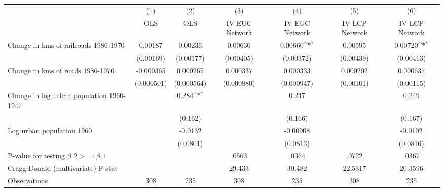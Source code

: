 {
\def\sym#1{\ifmmode^{#1}\else\(^{#1}\)\fi}
\begin{tabular}{l*{6}{c}}
\hline\hline
                &\multicolumn{1}{c}{(1)}&\multicolumn{1}{c}{(2)}&\multicolumn{1}{c}{(3)}&\multicolumn{1}{c}{(4)}&\multicolumn{1}{c}{(5)}&\multicolumn{1}{c}{(6)}\\
                &\multicolumn{1}{c}{OLS}&\multicolumn{1}{c}{OLS}&\multicolumn{1}{c}{IV EUC Network}&\multicolumn{1}{c}{IV EUC Network}&\multicolumn{1}{c}{IV LCP Network}&\multicolumn{1}{c}{IV LCP Network}\\
\hline
Change in kms of railroads 1986-1970&  0.00187         &  0.00236         &  0.00630         &  0.00660\sym{*}  &  0.00595         &  0.00720\sym{*}  \\
                &(0.00169)         &(0.00177)         &(0.00405)         &(0.00372)         &(0.00439)         &(0.00413)         \\
[1em]
Change in kms of roads 1986-1970&-0.000365         & 0.000265         & 0.000337         & 0.000333         & 0.000202         & 0.000637         \\
                &(0.000501)         &(0.000564)         &(0.000880)         &(0.000947)         &(0.00101)         &(0.00115)         \\
[1em]
Change in log urban population 1960-1947&                  &    0.284\sym{*}  &                  &    0.247         &                  &    0.249         \\
                &                  &  (0.162)         &                  &  (0.166)         &                  &  (0.167)         \\
[1em]
Log urban population 1960&                  &  -0.0132         &                  & -0.00908         &                  &  -0.0102         \\
                &                  & (0.0801)         &                  & (0.0813)         &                  & (0.0816)         \\
\hline
P-value for testing $\beta\_{2} >= \beta\_{1}$&                  &                  &    .0563         &    .0364         &    .0722         &    .0367         \\
Cragg-Donald (multivariate) F-stat&                  &                  &   29.433         &   30.482         &  22.5317         &  20.3596         \\
Observations    &      308         &      235         &      308         &      235         &      308         &      235         \\
\hline\hline
\end{tabular}
}
